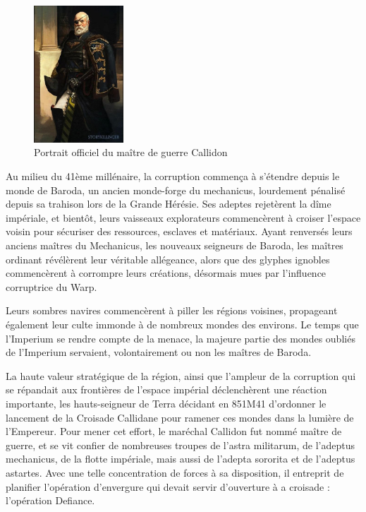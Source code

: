 \documentclass[10pt,a4paper]{book}
\newcommand{\croisade}{Croisade Callidane }
\begin{document}
\begin{figure}
  \centering
  \includegraphics[width = 0.3\textwidth]{officer 3.jpg}
  \caption{Portrait officiel du maître de guerre Callidon}
\end{figure}

Au milieu du 41ème millénaire, la corruption commença à s'étendre depuis le monde de Baroda, un ancien monde-forge du mechanicus, lourdement pénalisé depuis sa trahison lors de la Grande Hérésie. Ses adeptes rejetèrent la dîme impériale, et bientôt, leurs vaisseaux explorateurs commencèrent à croiser l'espace voisin pour sécuriser des ressources, esclaves et matériaux. Ayant renversés leurs anciens maîtres du Mechanicus, les nouveaux seigneurs de Baroda, les maîtres ordinant révélèrent leur véritable allégeance, alors que des glyphes ignobles commencèrent à corrompre leurs créations, désormais mues par l'influence corruptrice du Warp.


Leurs sombres navires commencèrent à piller les régions voisines, propageant également leur culte immonde à de nombreux mondes des environs. Le temps que l'Imperium se rendre compte de la menace, la majeure partie des mondes oubliés de l'Imperium servaient, volontairement ou non les maîtres de Baroda.


La haute valeur stratégique de la région, ainsi que l'ampleur de la corruption qui se répandait aux frontières de l'espace impérial déclenchèrent une réaction importante, les hauts-seigneur de Terra décidant en 851M41 d'ordonner le lancement de la \croisade pour ramener ces mondes dans la lumière de l'Empereur. Pour mener cet effort, le maréchal Callidon fut nommé maître de guerre, et se vit confier de nombreuses troupes de l'astra militarum, de l'adeptus mechanicus, de la flotte impériale, mais aussi de l'adepta sororita et de l'adeptus astartes. Avec une telle concentration de forces à sa disposition, il entreprit de planifier l'opération d'envergure qui devait servir d'ouverture à a croisade : l'opération Defiance. 
\end{document}
